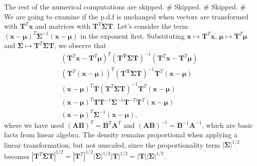 \documentclass[12pt, a4paper]{article}
\newcommand{\vect}[1]{\bm{#1}}
\newcommand{\abs}[1]{\left\lvert#1\right\rvert}
\begin{document}
\begin{easylist}[enumerate]
The rest of the numerical computations are skipped.
# Skipped.
# Skipped.
# We are going to examine if the p.d.f is unchanged when vectors are transformed with $\vect{T}^T \vect{x}$ and matrices with $\vect{T}^T \vect{\Sigma} \vect{T}$.
Let's consider the term $\left(\vect{x} - \vect{\mu}\right)^T \vect{\Sigma}^{-1} \left(\vect{x} - \vect{\mu}\right)$ in the exponent first.
Substituting $\vect{x} \mapsto \vect{T}^T \vect{x}$,
$\vect{\mu} \mapsto \vect{T}^T \vect{\mu}$ and
$\vect{\Sigma} \mapsto \vect{T}^T \vect{\Sigma} \vect{T}$, we observe that
\begin{gather*}
	\left(\vect{T}^T\vect{x} - \vect{T}^T\vect{\mu}\right)^T
	 \left( \vect{\vect{T}^T\Sigma}\vect{T}  \right)^{-1}
	 \left(\vect{T}^T\vect{x} - \vect{T}^T\vect{\mu}\right) \\
	\left(\vect{T}^T\left(\vect{x} - \vect{\mu}\right)\right)^T
	 \left( \vect{\vect{T}^T\Sigma}\vect{T}  \right)^{-1}
	 \vect{T}^T\left(\vect{x} - \vect{\mu}\right) \\
	 \left(\vect{x} - \vect{\mu}\right)^T \vect{T}
	 \left( \vect{T}^T \vect{\Sigma}\vect{T}  \right)^{-1}
	 \vect{T}^T\left(\vect{x} - \vect{\mu}\right) \\
	 \left(\vect{x} - \vect{\mu}\right)^T \vect{T}
	 \vect{T}^{-1} \vect{\Sigma}^{-1}\vect{T}^{-T}
	 \vect{T}^T\left(\vect{x} - \vect{\mu}\right) \\
	 \left(\vect{x} - \vect{\mu}\right)^T 
	  \vect{\Sigma}^{-1}
	 \left(\vect{x} - \vect{\mu}\right),
\end{gather*}
where we have used $(\vect{A}\vect{B})^T = \vect{B}^T \vect{A}^T$ and $(\vect{A}\vect{B})^{-1} = \vect{B}^{-1} \vect{A}^{-1}$, which are basic facts from linear algebra.
The density remains proportional when applying a linear transformation, but not unscaled, since the proportionality term $\abs{\vect{\Sigma}}^{1/2}$ becomes $\abs{\vect{T}^T \vect{\Sigma} \vect{T}}^{1/2} = \abs{\vect{T}^T}^{1/2}  \abs{\vect{\Sigma} }^{1/2}  \abs{ \vect{T}}^{1/2} = \abs{\vect{T}} \abs{\vect{\Sigma} }^{1/2}$.


\end{easylist}
\end{document}
